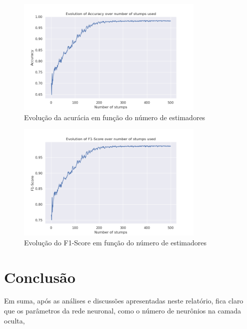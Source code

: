 \documentclass{article}
\begin{document}
\begin{figure}[H]
    \centering
    \includegraphics[width=0.8\textwidth]{images/Accuracy.png}
    \caption{Evolução da acurácia em função do número de estimadores}
\end{figure}

\begin{figure}[H]
    \centering
    \includegraphics[width=0.8\textwidth]{images/F1-Score.png}
    \caption{Evolução do F1-Score em função do número de estimadores}
\end{figure}

\section{Conclusão}

Em suma, após as análises e discussões apresentadas neste relatório, fica claro
que os parâmetros da rede neuronal, como o número de neurônios na camada
oculta,
\end{document}
